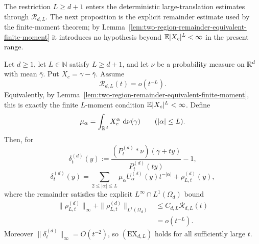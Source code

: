 The restriction \(L\ge d+1\) enters the deterministic large-translation
estimates through \(\mathcal R_{d,L}\).  The next proposition is the explicit
remainder estimate used by the finite-moment theorem; by
Lemma~\ref{lem:two-region-remainder-equivalent-finite-moment} it introduces
no hypothesis beyond \(\mathbb{E}|X_c|^L<\infty\) in the present range.

\begin{proposition}%
\label{thm:multidimensional-conditional-tail-density-quotient}
Let \(d\ge1\), let \(L\in\mathbb N\) satisfy \(L\ge d+1\), and let \(\nu\) be
a probability measure on \(\mathbb{R}^d\) with mean \(\bar{\gamma}\).  Put
\(X_c=\gamma-\bar{\gamma}\).  Assume
\[
\mathcal R_{d,L}(t)=o(t^{-L}).
\]
Equivalently, by Lemma~\ref{lem:two-region-remainder-equivalent-finite-moment},
this is exactly the finite \(L\)-moment condition
\(\mathbb{E}|X_c|^L<\infty\).  Define
\[
\begin{gathered}
\mu_\alpha=\int_{\mathbb{R}^d}X_c^\alpha\,\,\mathrm{d}\nu(\gamma)
\qquad(|\alpha|\le L).
\end{gathered}
\]
Then, for
\[
\delta_t^{(d)}(y):=
\frac{(P_t^{(d)}*\nu)(\bar{\gamma}+ty)}
{P_t^{(d)}(ty)}-1,
\]
\begin{equation}\label{eq:multidim-density-quotient-expansion-main}
\delta_t^{(d)}(y)=
\sum_{2\le|\alpha|\le L}\mu_\alpha U_\alpha^{(d)}(y)t^{-|\alpha|}
+\rho_{L,t}^{(d)}(y),
\end{equation}
where the remainder satisfies the explicit \(L^\infty\cap L^1(\Omega_d)\)
bound
\begin{equation}\label{eq:multidim-density-quotient-explicit-remainder}
\begin{aligned}
\|\rho_{L,t}^{(d)}\|_\infty+
\|\rho_{L,t}^{(d)}\|_{L^1(\Omega_d)}
&\le C_{d,L}\mathcal R_{d,L}(t)  \\
&=o(t^{-L}).
\end{aligned}
\end{equation}
Moreover \(\|\delta_t^{(d)}\|_\infty=O(t^{-2})\), so
\((\mathrm{EX}_{d,L})\) holds for all sufficiently large \(t\).
\end{proposition}

